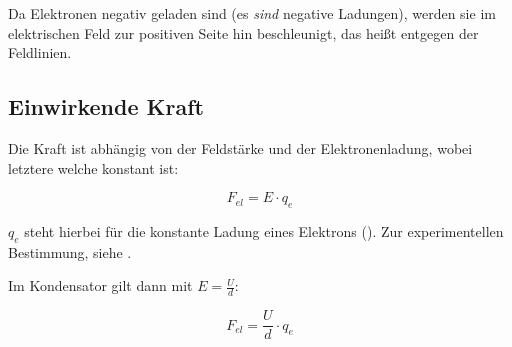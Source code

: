




%
%	






Da Elektronen negativ geladen sind (es \emph{sind} negative Ladungen), werden sie im elektrischen Feld zur positiven Seite hin beschleunigt, das heißt entgegen der Feldlinien. 

\subsection{Einwirkende Kraft}

Die Kraft ist abhängig von der Feldstärke und der Elektronenladung, wobei letztere welche konstant ist:

\begin{equation}
	F_{el} = E \cdot q_e
\end{equation}

\noindent $q_e$ steht hierbei für die konstante Ladung eines Elektrons (). Zur experimentellen Bestimmung, siehe .

Im Kondensator gilt dann mit $E=\frac{U}{d}$:

\begin{equation} \label{eq:F_el}
	F_{el} = \frac{U}{d} \cdot q_e
\end{equation}

